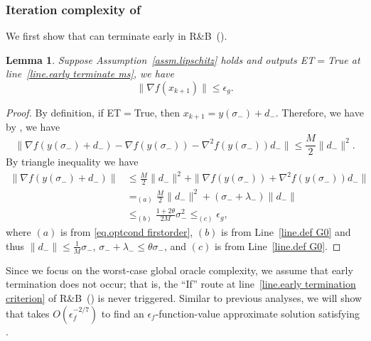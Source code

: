 \documentclass{article}
\newtheorem{lemma}[theorem]{Lemma}
\numberwithin{equation}{section}
\numberwithin{equation}{section}
\begin{document}
\subsubsection{Iteration complexity of }
We first show that  can terminate early in R\&B~().
\begin{lemma}
    \label{lem.early termination ms}
    Suppose Assumption~\ref{assm.lipschitz} holds and  outputs ET$=$True at line~\ref{line.early terminate ms}, we have
    \begin{equation*}
        \|\nabla f(x_{k+1}) \|\leq \epsilon_g.
    \end{equation*}
\end{lemma}
\begin{proof}
    By definition, if ET$=$True, then $x_{k+1} = y(\sigma_-)+d_-$. Therefore, we have
    by , we have
    \begin{equation*}
        \|\nabla f(y(\sigma_-)+d_-)-\nabla f(y(\sigma_-))-\nabla^2 f(y(\sigma_-))d_-\|\leq \frac{M}{2}\|d_-\|^2.
    \end{equation*}
    By triangle inequality we have
    \begin{equation*}
        \begin{aligned}
            \|\nabla f(y(\sigma_-)+d_-)\| & \leq \frac{M}{2}\|d_-\|^2+\| \nabla f(y(\sigma_-))+\nabla^2 f(y(\sigma_-))d_-\| \\
                                          & =_{(a)} \frac{M}{2}\|d_-\|^2+(\sigma_-+\lambda_-) \|d_-\|                       \\
                                          & \leq_{(b)} \frac{1+2\theta}{2M}\sigma_-^2  \leq_{(c)} \epsilon_g,
        \end{aligned}
    \end{equation*}
    where $(a)$ is from \eqref{eq.optcond firstorder}, $(b)$ is from Line~\ref{line.def G0} and thus $\|d_-\| \leq \frac{1}{M}\sigma_-$, $\sigma_-+\lambda_-\leq \theta\sigma_-$, and $(c)$ is from Line~\ref{line.def G0}.
\end{proof}
Since we focus on the worst-case global oracle complexity, we assume that early termination does not occur; that is, the ``If'' route at line~\ref{line.early termination criterion} of R\&B~() is never triggered. Similar to previous analyses, we will show that  takes $O(\epsilon_f^{-2/7})$ to find an $\epsilon_f$-function-value approximate solution satisfying .
\end{document}
